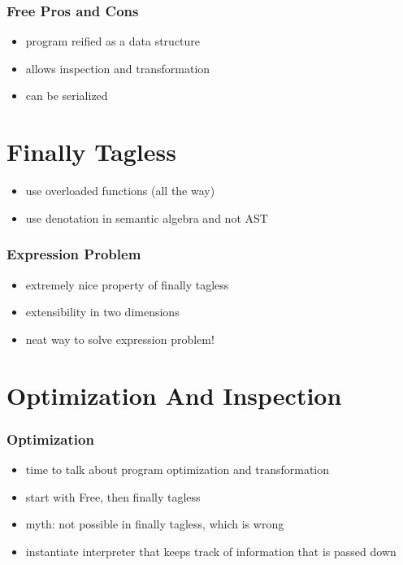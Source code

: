 \documentclass[aspectratio=169]{beamer}
\begin{document}
\begin{frame}
  \frametitle{Free \textemdash{} Pros and Cons}
  \begin{itemize}
  \item program reified as a data structure
  \item allows inspection and transformation
  \item can be serialized
  \end{itemize}

  \section{Finally Tagless}\label{sec:finally-tagless}

\begin{frame}
  \begin{itemize}
  \item use overloaded functions (all the way)
  \item use denotation in semantic algebra and not AST
  \end{itemize}
\end{frame}

\begin{frame}
  \frametitle{Expression Problem}
  \begin{itemize}
  \item extremely nice property of finally tagless
  \item extensibility in two dimensions
  \item neat way to solve expression problem!
  \end{itemize}
\end{frame}

\end{frame}

\section{Optimization And Inspection}\label{sec:optimization-and-inspection}

\begin{frame}
  \frametitle{Optimization}
  \begin{itemize}
  \item time to talk about program optimization and transformation
  \item start with Free, then finally tagless
  \item myth: not possible in finally tagless, which is wrong
  \item instantiate interpreter that keeps track of information that is passed down
  \end{itemize}
\end{frame}
\end{document}
